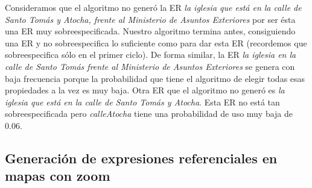 Consideramos que el algoritmo no gener\'o la ER {\it la iglesia que est\'a en la calle de Santo Tom\'as y Atocha, frente al Ministerio de Asuntos Exteriores} por ser \'esta una ER muy sobreespecificada. Nuestro algoritmo termina antes, consiguiendo una ER y no sobreespecifica lo suficiente como para dar esta ER (recordemos que sobreespecifica s\'olo en el primer ciclo). De forma similar, la ER {\it la iglesia en la calle de Santo Tom\'as frente al Ministerio de Asuntos Exteriores} se genera con baja frecuencia porque la probabilidad que tiene el algoritmo de elegir todas esas propiedades a la vez es muy baja.  Otra ER que el algoritmo no gener\'o es {\it la iglesia que est\'a en la calle de Santo Tom\'as y Atocha}. Esta ER no est\'a tan sobreespecificada pero {\it calleAtocha} tiene una probabilidad de uso muy baja de 0.06.


\subsection{Generaci\'on de expresiones referenciales en mapas con zoom}
\label{sec:conzoom}

